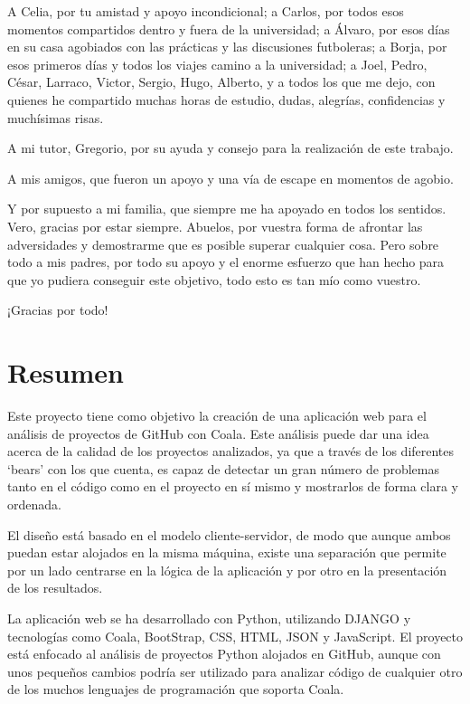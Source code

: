 \documentclass[a4paper, 12pt]{book}
\begin{document}
A Celia, por tu amistad y apoyo incondicional; a Carlos, por todos esos momentos compartidos dentro y fuera de la universidad; a Álvaro, por esos días en su casa agobiados con las prácticas y las discusiones futboleras; a Borja, por esos primeros días y todos los viajes camino a la universidad; a Joel, Pedro, César, Larraco, Victor, Sergio, Hugo, Alberto, y a todos los que me dejo, con quienes he compartido muchas horas de estudio, dudas, alegrías, confidencias y muchísimas risas.

A mi tutor, Gregorio, por su ayuda y consejo para la realización de este trabajo.

A mis amigos, que fueron un apoyo y una vía de escape en momentos de agobio.

Y por supuesto a mi familia, que siempre me ha apoyado en todos los sentidos. Vero, gracias por estar siempre. Abuelos, por vuestra forma de afrontar las adversidades y demostrarme que es posible superar cualquier cosa. Pero sobre todo a mis padres, por todo su apoyo y el enorme esfuerzo que han hecho para que yo pudiera conseguir este objetivo, todo esto es tan mío como vuestro.

¡Gracias por todo!


\chapter*{Resumen}

Este proyecto tiene como objetivo la creación de una aplicación web para el análisis de
proyectos de GitHub con Coala. Este análisis puede dar una idea acerca de la calidad de
los proyectos analizados, ya que a través de los diferentes `bears' con los que cuenta, es
capaz de detectar un gran número de problemas tanto en el código como en el proyecto en sí mismo
y mostrarlos de forma clara y ordenada.

El diseño está basado en el modelo cliente-servidor, de modo que aunque ambos puedan estar
alojados en la misma máquina, existe una separación que permite por un lado centrarse en la
lógica de la aplicación y por otro en la presentación de los resultados.

La aplicación web se ha desarrollado con Python, utilizando DJANGO y tecnologías como Coala, 
BootStrap, CSS, HTML, JSON y JavaScript. El proyecto está enfocado al análisis de proyectos 
Python alojados en GitHub, aunque con unos pequeños cambios podría ser utilizado para analizar 
código de cualquier otro de los muchos lenguajes de programación que soporta Coala.
\end{document}
